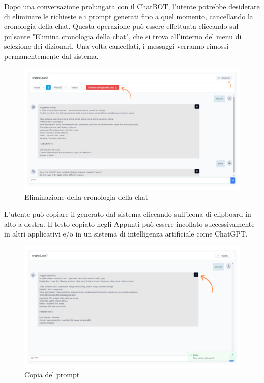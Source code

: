 
\par Dopo una conversazione prolungata con il ChatBOT, l'utente potrebbe desiderare di eliminare le richieste e i prompt generati fino a quel momento, cancellando la cronologia della chat. Questa operazione può essere effettuata cliccando sul pulsante "Elimina cronologia della chat", che si trova all'interno del menu di selezione dei dizionari. Una volta cancellati, i messaggi verranno rimossi permanentemente dal sistema.

\begin{figure}[H]
  \centering
  \includegraphics[width=1\textwidth]{assets/elimina_chat.png}
  \caption{Eliminazione della cronologia della chat}
\end{figure}


\par L'utente può copiare il  generato dal sistema cliccando sull'icona di clipboard in alto a destra. Il testo copiato negli Appunti può essere incollato successivamente in altri applicativi e/o in un sistema di intelligenza artificiale come ChatGPT.

\begin{figure}[H]
  \centering
  \includegraphics[width=1\textwidth]{assets/copia.png}
  \caption{Copia del prompt}
\end{figure}

